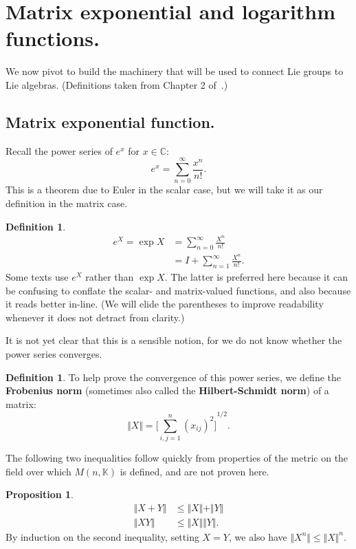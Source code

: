 \documentclass[12pt]{article}
\newcommand{\C}{\mathbb{C}}
\newcommand{\K}{\mathbb{K}}
\newcommand{\V}{\Vert}
\theoremstyle{definition}
\newtheorem{prop}[them]{Proposition}
\theoremstyle{definition}
\theoremstyle{definition}
\theoremstyle{definition}
\theoremstyle{definition}
\newtheorem{defn}[them]{Definition}
\theoremstyle{definition}
\theoremstyle{definition}
\theoremstyle{definition}
\begin{document}
\section{Matrix exponential and logarithm functions.}

\par{We now pivot to build the machinery that will
be used to connect Lie groups to Lie algebras.
(Definitions taken from Chapter 2
of~\cite{Hall}.)}

\subsection{Matrix exponential function.}
\par{
Recall the power series of $e^x$ for $x \in \C$:
\[
    e^x = \sum_{n=0}^{\infty}\frac{x^n}{n!}.
\] 
This is a theorem due to Euler in the scalar case,
but we will take it as our definition in the
matrix case.}

\begin{defn}\label{def:exp}
\[
\begin{aligned}
    e^X = \exp X & = \sum_{n=0}^{\infty}\frac{X^n}{n!} \\ 
    & = I + \sum_{n=1}^{\infty}\frac{X^n}{n!}.
\end{aligned}
\] 
Some texts use $e^X$ rather than $\exp X$. The
latter is preferred here because it can be
confusing to conflate the scalar- and
matrix-valued functions, and also because it reads
better in-line. (We will elide the parentheses to
improve readability whenever it does not detract
from clarity.)
\end{defn}

\par{It is not yet clear that this is a sensible
notion, for we do not know whether the power
series converges.}

\begin{defn}
To help prove the convergence of this power series, we
define the \textbf{Frobenius norm} (sometimes also
called the \textbf{Hilbert-Schmidt norm}) of a
matrix:
\[
    \V X \V = {\Big[\sum_{i,j=1}^{n}{(x_{ij})}^2 \Big]}^{1/2}.
\]
\end{defn} 

\par{The following two inequalities follow quickly
from properties of the metric on the field over
which $M(n, \K)$ is defined, and are not proven
here.}
\begin{prop}\label{prop:normprop}
\[
\begin{aligned}
    \V X + Y \V & \leq \V X \V + \V Y \V \\
    \V XY \V & \leq \V X \V \V Y \V.
\end{aligned}
\] 
By induction on the second inequality, setting $X
= Y$, we also have $\V X^n \V \leq \V X \V^n$.
\end{prop}
\end{document}
